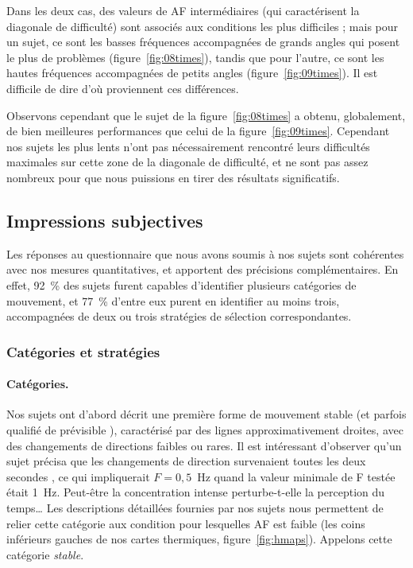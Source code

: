 	Dans les deux cas, des valeurs de AF intermédiaires (qui caractérisent la diagonale de difficulté) sont associés aux conditions les plus difficiles ; mais pour un sujet, ce sont les basses fréquences accompagnées de grands angles qui posent le plus de problèmes (figure~\ref{fig:08times}), tandis que pour l'autre, ce sont les hautes fréquences accompagnées de petits angles (figure~\ref{fig:09times}). Il est difficile de dire d'où proviennent ces différences.
	
	Observons cependant que le sujet de la figure~\ref{fig:08times} a obtenu, globalement, de bien meilleures performances que celui de la figure~\ref{fig:09times}. Cependant nos sujets les plus lents n'ont pas nécessairement rencontré leurs difficultés maximales sur cette zone de la diagonale de difficulté, et ne sont pas assez nombreux pour que nous puissions en tirer des résultats significatifs.

	\subsection{Impressions subjectives}
	Les réponses au questionnaire que nous avons soumis à nos sujets sont cohérentes avec nos mesures quantitatives, et apportent des précisions complémentaires. En effet, 92~\%{} des sujets furent capables d'identifier plusieurs catégories de mouvement, et 77~\%{} d'entre eux purent en identifier au moins trois, accompagnées de deux ou trois stratégies de sélection correspondantes.
	
	\subsubsection{Catégories et stratégies}
	\paragraph{Catégories.}
	Nos sujets ont d'abord décrit une première forme de mouvement \og stable \fg{} (et parfois qualifié de \og prévisible \fg{}), caractérisé par des lignes approximativement droites, avec des changements de directions faibles ou rares. Il est intéressant d'observer qu'un sujet précisa que les changements de direction survenaient \og toutes les deux secondes \fg{}, ce qui impliquerait $F = 0,5$~Hz quand la valeur minimale de F testée était 1~Hz. Peut-être la concentration intense perturbe-t-elle la perception du temps\ldots{} Les descriptions détaillées fournies par nos sujets nous permettent de relier cette catégorie aux condition pour lesquelles AF est faible (les coins inférieurs gauches de nos cartes thermiques, figure~\ref{fig:hmaps}). Appelons cette catégorie \emph{stable}.
	
